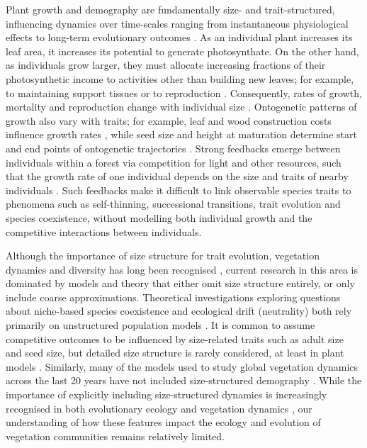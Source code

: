 \documentclass[a4paper,11pt]{article}
\begin{document}
Plant growth and demography are fundamentally size- and
trait-structured, influencing dynamics over time-scales ranging from
instantaneous physiological effects to long-term evolutionary outcomes
\citep{Harper-1977, Westoby-2002}.
%
As an individual plant increases its leaf area, it increases its potential
to generate photosynthate.
%
On the other hand, as individuals grow larger, they must allocate increasing
fractions of their photosynthetic income to activities other
than building new leaves; for example, to maintaining support tissues
\citep{Givnish-1988, Enquist-2007} or to reproduction
\citep{Thomas-2011}.
%
Consequently, rates of growth, mortality and reproduction change with
individual size \citep{Muller-2006, Ruger-2011, Thomas-2011}.
Ontogenetic
patterns of growth also vary with traits; for example,
leaf and wood construction costs influence growth rates
\citep{Wright-2010}, while seed size and height
at maturation determine start and end points of ontogenetic
trajectories \citep{Westoby-2002}.
%
Strong feedbacks emerge between individuals within a forest via
competition for light and other resources, such that the growth rate
of one individual depends on the size and traits of nearby
individuals \citep{Shugart-1980, Pacala-1996}.
%
Such feedbacks make it difficult to link observable species traits to
phenomena such as self-thinning, successional transitions, trait
evolution and species coexistence, without
modelling both individual growth and the competitive interactions between
individuals.

Although the importance of size structure for trait evolution, vegetation
dynamics and diversity has long been recognised \citep[e.g.,][]{Harper-1977,
 Shugart-1980, Huston-1987}, current research in this area is
dominated by models and theory that either omit size structure
entirely, or only include coarse approximations.
%
Theoretical investigations exploring questions about niche-based
species coexistence and ecological drift (neutrality) both rely
primarily on unstructured population models \citep[e.g.,][]{MacArthur-1967,
 Tilman-1985, Geritz-1998, Hubbell-2001, Calcagno-2006}.
%
It is common to assume competitive outcomes to be influenced by
size-related traits such as adult size and seed size, but detailed
size structure is rarely considered, at least in plant models
\cite[for animal examples, see][]{Deroos-1988, Deroos-1992}.
%
Similarly, many of the models used to study global vegetation dynamics across
the last 20 years have not included size-structured demography
\citep[for comparisons of some major models, see][]{Sitch-2008,
Dekauwe-2014}.
%
While the importance of explicitly including size-structured dynamics is
increasingly recognised in both evolutionary ecology
\citep[e.g.,][]{Falster-2015} and vegetation dynamics
\citep[e.g.,][]{Moorcroft-2001, Purves-2008, Smith-2014,
Weng-2015, Sakschewski-2015}, our understanding of how these features
impact the ecology and evolution of vegetation communities remains
relatively limited.
\end{document}
